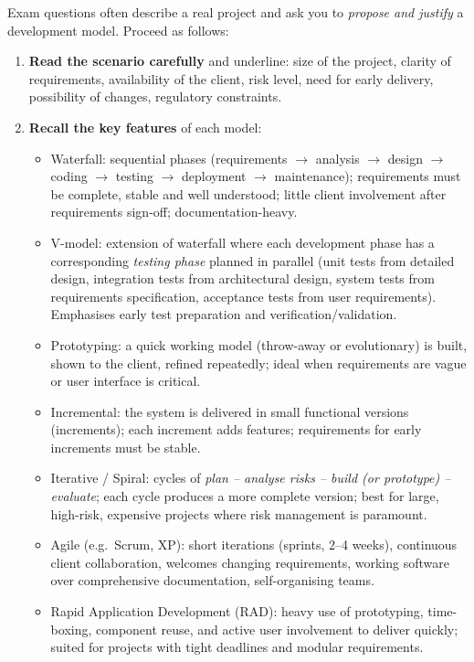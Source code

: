 \documentclass[11pt]{article}
\newcommand{\cle}[1]{{\popxbold\color{popdark}#1}}
\begin{document}
\begin{methode}
Exam questions often describe a real project and ask you to \emph{propose and justify} a development model. Proceed as follows:
\begin{enumerate}
\item \textbf{Read the scenario carefully} and underline: size of the project, clarity of requirements, availability of the client, risk level, need for early delivery, possibility of changes, regulatory constraints.
\item \textbf{Recall the key features} of each model:
\begin{itemize}
\item \cle{Waterfall}: sequential phases (requirements $\rightarrow$ analysis $\rightarrow$ design $\rightarrow$ coding $\rightarrow$ testing $\rightarrow$ deployment $\rightarrow$ maintenance); requirements must be complete, stable and well understood; little client involvement after requirements sign-off; documentation-heavy.
\item \cle{V-model}: extension of waterfall where each development phase has a corresponding \emph{testing phase} planned in parallel (unit tests from detailed design, integration tests from architectural design, system tests from requirements specification, acceptance tests from user requirements). Emphasises early test preparation and verification/validation.
\item \cle{Prototyping}: a quick working model (throw-away or evolutionary) is built, shown to the client, refined repeatedly; ideal when requirements are vague or user interface is critical.
\item \cle{Incremental}: the system is delivered in small functional versions (increments); each increment adds features; requirements for early increments must be stable.
\item \cle{Iterative / Spiral}: cycles of \emph{plan – analyse risks – build (or prototype) – evaluate}; each cycle produces a more complete version; best for large, high-risk, expensive projects where risk management is paramount.
\item \cle{Agile} (e.g.\ Scrum, XP): short iterations (sprints, 2–4 weeks), continuous client collaboration, welcomes changing requirements, working software over comprehensive documentation, self-organising teams.
\item \cle{Rapid Application Development (RAD)}: heavy use of prototyping, time-boxing, component reuse, and active user involvement to deliver quickly; suited for projects with tight deadlines and modular requirements.

\end{itemize}
\end{enumerate}
\end{methode}
\end{document}
